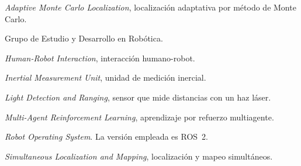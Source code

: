
\begin{description}[style=unboxed,leftmargin=0pt,itemsep=0em,parsep=0pt]
  \item[AMCL.] \textit{Adaptive Monte Carlo Localization}, localización adaptativa por método de Monte Carlo.
  \item[GED.] Grupo de Estudio y Desarrollo en Robótica.
  \item[HRI.] \textit{Human-Robot Interaction}, interacción humano-robot.
  \item[IMU.] \textit{Inertial Measurement Unit}, unidad de medición inercial.
  \item[LiDAR.] \textit{Light Detection and Ranging}, sensor que mide distancias con un haz láser.
  \item[MARL.] \textit{Multi-Agent Reinforcement Learning}, aprendizaje por refuerzo multiagente.
  \item[ROS.] \textit{Robot Operating System}. La versión empleada es ROS~2.
  \item[SLAM.] \textit{Simultaneous Localization and Mapping}, localización y mapeo simultáneos.
\end{description}
\onehalfspacing
